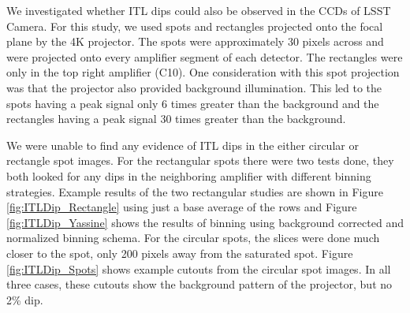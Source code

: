 We investigated whether ITL dips could also be observed in the CCDs of
LSST Camera. For this study, we used spots and rectangles projected onto the focal plane by the 4K
projector. The spots were approximately 30 pixels across
and were projected onto every amplifier segment of each detector. The rectangles were only
in the top right amplifier (C10). One consideration with this spot
projection was that the projector also provided background illumination. This led to the spots having a peak signal only 6 times greater
than the background and the rectangles having a peak signal 30 times greater
than the background.

We were unable to find any evidence of ITL
dips in the either circular or rectangle spot images. For the rectangular spots there were two tests done, they both looked for any dips in the neighboring amplifier with different binning strategies. Example results of the two rectangular studies are shown in Figure \ref{fig:ITLDip_Rectangle} using just a base average of the rows and Figure \ref{fig:ITLDip_Yassine} shows the results of binning using background corrected and normalized binning schema. For the circular spots, the slices were done much closer to the spot, only 200 pixels away from the saturated spot. Figure \ref{fig:ITLDip_Spots} shows example cutouts from the circular spot images. In all three cases, these cutouts show the background
pattern of the projector, but no 2\% dip.


